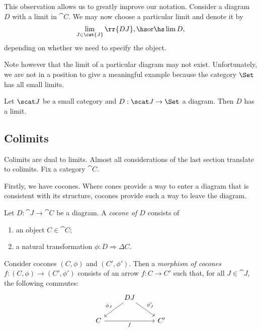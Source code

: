 \documentclass{article}
\begin{document}
\begin{notation}
  This observation allows us to greatly improve our notation. Consider a diagram
  $D$ with a limit in $\cat{C}$. We may now choose a particular limit and denote
  it by
  \begin{align*}
    \lim_{J\in\cat{J}}\rr{DJ},\hs\text{or}\hs\lim D,
  \end{align*}
  depending on whether we need to specify the object.
\end{notation}

Note however that the limit of a particular diagram may not exist. Unfortunately, we
are not in a position to give a meaningful example because the category $\Set$ has
all small limits.

\begin{theorem}
  Let $\scat J$ be a small category and $D:\scat J\to\Set$ a diagram. Then $D$ has a limit.
\end{theorem}



\subsection{Colimits}

Colimits are dual to limits. Almost all considerations of the last section translate
to colimits. Fix a category $\cat{C}$.

Firstly, we have cocones. Where cones provide a way to enter a diagram that is consistent
with its structure, cocones provide such a way to leave the diagram.

\begin{definition}
  Let $D:\cat{J}\to\cat{C}$ be a diagram. A \emph{cocone of $D$} consists of
  \begin{enumerate}
    \item an object $C\in\cat{C}$;
    \item a natural transformation $\phi:D\Rightarrow\Delta C$.
  \end{enumerate}
  Consider cocones $(C,\phi)$ and $(C',\phi')$. Then a \emph{morphism of cocones $f:(C,\phi)\to(C',\phi')$} consists of
  an arrow $f:C\to C'$ such that, for all $J\in\cat{J}$, the following
  commutes:
  \begin{equation}
    \begin{tikzcd}
  & DJ \\
      C && {C'}
      \arrow["f"', from=2-1, to=2-3]
      \arrow["{\phi_J'}", from=1-2, to=2-3]
      \arrow["{\phi_J}"', from=1-2, to=2-1]
    \end{tikzcd}
  \end{equation}
\end{definition}
\end{document}
